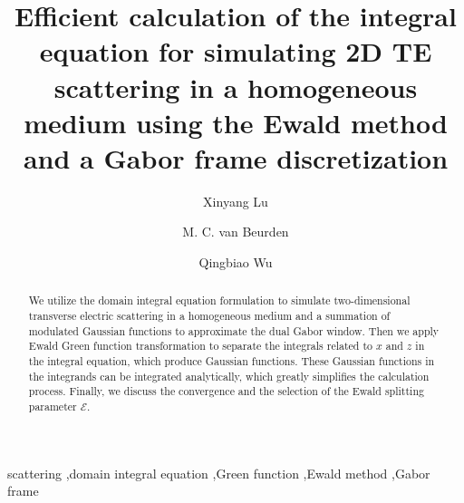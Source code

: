 \documentclass[preprint,12pt]{elsarticle}
\begin{document}
\begin{frontmatter}



\title{Efficient calculation of the integral equation for simulating 2D TE scattering in a homogeneous medium using the Ewald method and a Gabor frame discretization}


\author[label1]{Xinyang Lu}
      \address[label1]{School of Mathematical Sciences, Zhejiang University, Hangzhou 310027, Zhejiang, China}
       \address[label2]{Department of Electrical Engineering, Eindhoven University of Technology, P.O. Box 513, 5600 MB Eindhoven, The Netherlands}
\author[label2]{M. C. van Beurden}
\author[label1]{Qingbiao Wu}
      

\begin{abstract}
We utilize the domain integral equation formulation to simulate two-dimensional transverse electric scattering in a homogeneous medium and a summation of modulated Gaussian functions to approximate the dual Gabor window.
Then we apply Ewald Green function transformation to separate the integrals related to $x$ and $z$ in the integral equation, which %
produce Gaussian functions. These Gaussian functions in the integrands can be integrated analytically, which greatly simplifies the calculation process. Finally, we discuss the convergence and the selection of the Ewald splitting parameter $\mathcal{E}$.
\end{abstract}

\begin{keyword}

scattering \sep domain integral equation \sep Green function \sep Ewald method  \sep Gabor frame 
\end{keyword}

\end{frontmatter}
\end{document}
